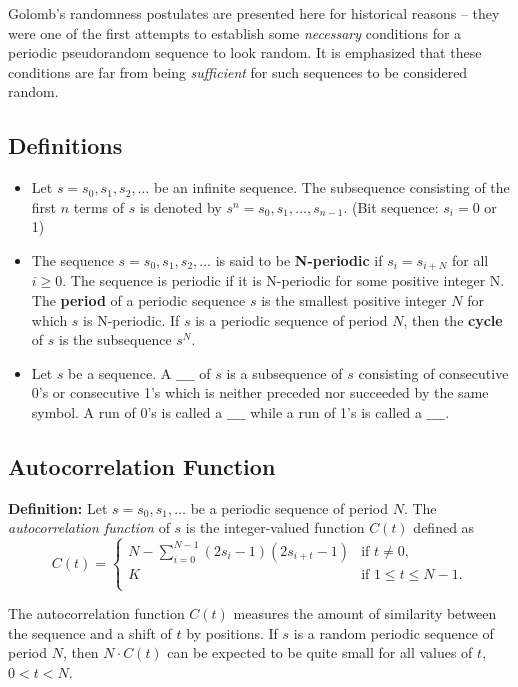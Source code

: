 \documentclass[12pt,openany]{book}
\theoremstyle{definition}
\begin{document}
	Golomb’s randomness postulates are presented here for historical reasons – they were one of the first attempts to establish some \textit{necessary} conditions for a periodic pseudorandom sequence to look random. It is emphasized that these conditions are far from being \textit{sufficient} for such sequences to be considered random.
	
	\subsection*{Definitions}
	\begin{itemize}
		\item Let \( s = s_0, s_1, s_2, \ldots \) be an infinite sequence. The subsequence consisting of the first \( n \) terms of \( s \) is denoted by \( s^n = s_0, s_1, \ldots, s_{n-1} \). (Bit sequence: \( s_i = 0 \) or 1)
		\item The sequence \( s = s_0, s_1, s_2, \ldots \) is said to be \textbf{N-periodic} if \( s_i = s_{i+N} \) for all \( i \geq 0 \). The sequence is periodic if it is N-periodic for some positive integer N. The \textbf{period} of a periodic sequence \( s \) is the smallest positive integer \( N \) for which \( s \) is N-periodic. If \( s \) is a periodic sequence of period \( N \), then the \textbf{cycle} of \( s \) is the subsequence \( s^N \).
		\item Let \( s \) be a sequence. A \(\_\_\_\_\) of \( s \) is a subsequence of \( s \) consisting of consecutive 0’s or consecutive 1’s which is neither preceded nor succeeded by the same symbol. A run of 0’s is called a \(\_\_\_\_\) while a run of 1’s is called a \(\_\_\_\_\).
	\end{itemize}
	
	\subsection*{Autocorrelation Function}
	\textbf{Definition:} Let \( s = s_0, s_1, \ldots \) be a periodic sequence of period \( N \). The \textit{autocorrelation function} of \( s \) is the integer-valued function \( C(t) \) defined as
	\[ C(t) = \begin{cases} 
		N - \sum_{i=0}^{N-1} (2s_i - 1)(2s_{i+t} - 1) & \text{if } t \neq 0, \\
		K & \text{if } 1 \leq t \leq N - 1. \\
	\end{cases} \]
	
	The autocorrelation function \( C(t) \) measures the amount of similarity between the sequence and a shift of \( t \) by positions. If \( s \) is a random periodic sequence of period \( N \), then \( N \cdot C(t) \) can be expected to be quite small for all values of \( t \), \( 0 < t < N \).
	
\end{document}
